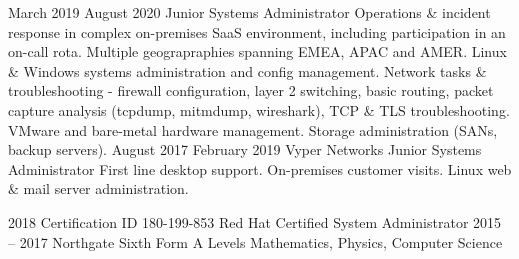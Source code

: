 \documentclass[9pt]{developercv}
\begin{document}
\begin{entrylist}
{            }
        \entry
            {\dateentry
                {March 2019}
                {August 2020}
            }
            {}
            {Junior Systems Administrator}
            {
                Operations \& incident response in complex on-premises SaaS environment,
                including participation in an on-call rota. Multiple geograpraphies spanning EMEA, APAC and AMER.
                Linux \& Windows systems administration and config management.
                Network tasks \& troubleshooting -
                firewall configuration, layer 2 switching, basic routing,
                packet capture analysis (tcpdump, mitmdump, wireshark), TCP \& TLS troubleshooting.
                VMware and bare-metal hardware management. Storage administration (SANs, backup servers).
            }
        \entry
            {\dateentry
                {August 2017}
                {February 2019}
            }
            {Vyper Networks}
            {Junior Systems Administrator}
            {
                First line desktop support.
                On-premises customer visits.
                Linux web \& mail server administration.
            }
    \end{entrylist}




    \begin{entrylist}
      \entry
        {2018}
        {Certification ID 180-199-853}
        {Red Hat Certified System Administrator}
        {}
      \entry
        {2015 -- 2017}
        {Northgate Sixth Form}
        {A Levels}
        {Mathematics, Physics, Computer Science}
    \end{entrylist}



\end{document}
